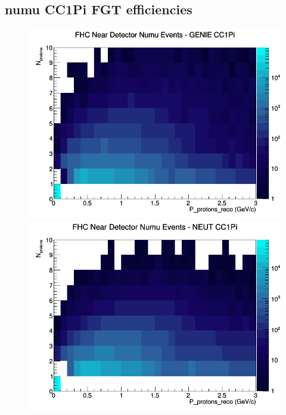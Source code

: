 \subsection{numu CC1Pi FGT efficiencies}
\begin{figure}[h]
\includegraphics[width=\linewidth]{eff_N_P/FGT/protons/CC1Pi_FHC_ND_numu_N_P_GENIE.png}
\endminipage
{}
\includegraphics[width=\linewidth]{eff_N_P/FGT/protons/CC1Pi_FHC_ND_numu_N_P_NEUT.png}
\endminipage
{}

\end{figure}
